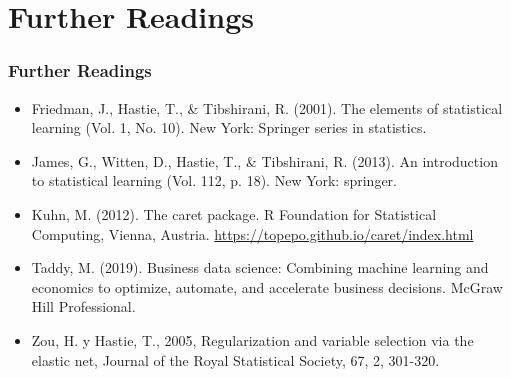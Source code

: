 \documentclass[
  shownotes,
  xcolor={svgnames},
  hyperref={colorlinks,citecolor=DarkBlue,linkcolor=DarkRed,urlcolor=DarkBlue}
  , aspectratio=169]{beamer}
\begin{document}
\section{Further Readings}
\begin{frame}
\frametitle{Further Readings}

\begin{itemize}


  \item Friedman, J., Hastie, T., \& Tibshirani, R. (2001). The elements of statistical learning (Vol. 1, No. 10). New York: Springer series in statistics.
  \medskip
  \item James, G., Witten, D., Hastie, T., \& Tibshirani, R. (2013). An introduction to statistical learning (Vol. 112, p. 18). New York: springer.
  \medskip
  \item Kuhn, M. (2012). The caret package. R Foundation for Statistical Computing, Vienna, Austria. \url{https://topepo.github.io/caret/index.html}
  \medskip
  \item Taddy, M. (2019). Business data science: Combining machine learning and economics to optimize, automate, and accelerate business decisions. McGraw Hill Professional.
  \medskip
  \item  Zou, H. y Hastie, T., 2005, Regularization and variable selection via the elastic net, Journal of the Royal Statistical Society, 67, 2, 301-320.
  
\end{itemize}

\end{frame}






\end{document}
